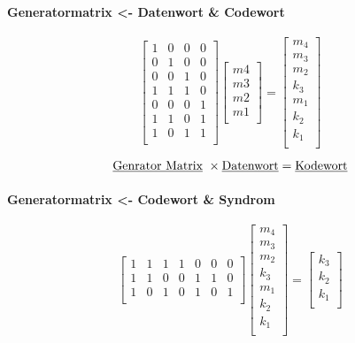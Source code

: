 \documentclass[a4paper]{scrartcl}
\begin{document}
					\paragraph{Generatormatrix <- Datenwort \& Codewort}
					\[
						\begin{bmatrix}
							1&0&0&0\\
							0&1&0&0\\
							0&0&1&0\\
							1&1&1&0\\
							0&0&0&1\\
							1&1&0&1\\
							1&0&1&1\\
						\end{bmatrix}
						\begin{bmatrix}
							m4\\
							m3\\
							m2\\
							m1\\
						\end{bmatrix}
						=
						\begin{bmatrix}
							m_4\\
							m_3\\
							m_2\\
							k_3\\
							m_1\\
							k_2\\
							k_1\\
						\end{bmatrix}
					\]
					
					\[ \text{\underline{Genrator Matrix} }\times \text{\underline{Datenwort}} = \text{\underline{Kodewort}} \]
					\paragraph{Generatormatrix <- Codewort \& Syndrom}
					\[
						\begin{bmatrix}
							1&1&1&1&0&0&0\\
							1&1&0&0&1&1&0\\
							1&0&1&0&1&0&1\\
						\end{bmatrix}
						\begin{bmatrix}
							m_4\\
							m_3\\
							m_2\\
							k_3\\
							m_1\\
							k_2\\
							k_1\\
						\end{bmatrix}
						=
						\begin{bmatrix}
							k_3\\
							k_2\\
							k_1\\
						\end{bmatrix}
					\]
					
\end{document}
